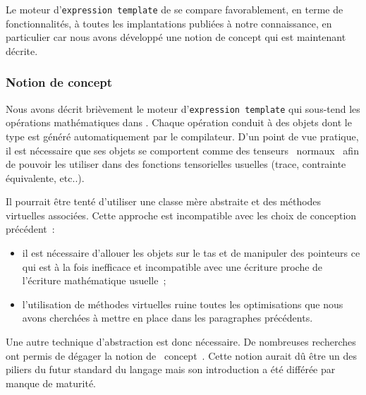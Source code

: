 \documentclass[rectoverso,pleiades,pstricks,leqno,anti]{texmf/note_technique_2010}
\newcommand{\tfel}[1]{\index{tfel}{#1}{\texttt{#1}}}
\def\ifmonospace{\ifdim\fontdimen3\font=0pt }
\def\cpp{%
\ifmonospace%
    C++%
\else%
    C\kern-.1667em\raise.30ex\hbox{\smaller{++}}%
\fi%
\spacefactor1000 }
\begin{document}
Le moteur d'\texttt{expression template} de \tfel{} se compare
favorablement, en terme de fonctionnalités, à toutes les implantations
publiées à notre connaissance, en particulier car nous avons développé
une notion de concept qui est maintenant décrite.

\subsubsection{Notion de concept}

Nous avons décrit brièvement le moteur d'\texttt{expression template}
qui sous-tend les opérations mathématiques dans \tfel{}. Chaque
opération conduit à des objets dont le type est généré automatiquement
par le compilateur. D'un point de vue pratique, il est nécessaire que
ses objets se comportent comme des tenseurs \og~normaux~\fg{} afin de
pouvoir les utiliser dans des fonctions tensorielles usuelles (trace,
contrainte équivalente, etc..).

Il pourrait être tenté d'utiliser une classe mère abstraite et des
méthodes virtuelles associées. Cette approche est incompatible avec
les choix de conception précédent~:
\begin{itemize}
\item il est nécessaire d'allouer les objets sur le tas et de
  manipuler des pointeurs ce qui est à la fois inefficace et
  incompatible avec une écriture proche de l'écriture mathématique
  usuelle~;
\item l'utilisation de méthodes virtuelles ruine toutes les
  optimisations que nous avons cherchées à mettre en place dans les
  paragraphes précédents.
\end{itemize}

Une autre technique d'abstraction est donc nécessaire. De nombreuses
recherches ont permis de dégager la notion de \og~concept~\fg{}. Cette
notion aurait dû être un des piliers du futur standard du langage
\cpp{} mais son introduction a été différée par manque de maturité.
\end{document}
